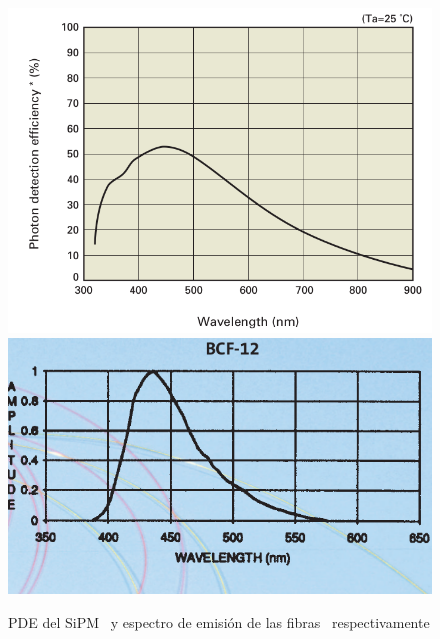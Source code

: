\begin{figure}[htb]
\centering
{
\includegraphics[scale=0.3]{PED.png} 
}
{
\includegraphics[scale=0.35]{EmisionBCF12.png} 
}
\label{8}
\caption{PDE del SiPM~\cite{datasheet SiPM} y espectro de emisión de las fibras~\cite{datasheet} respectivamente\label{Espectros}}
\end{figure}

